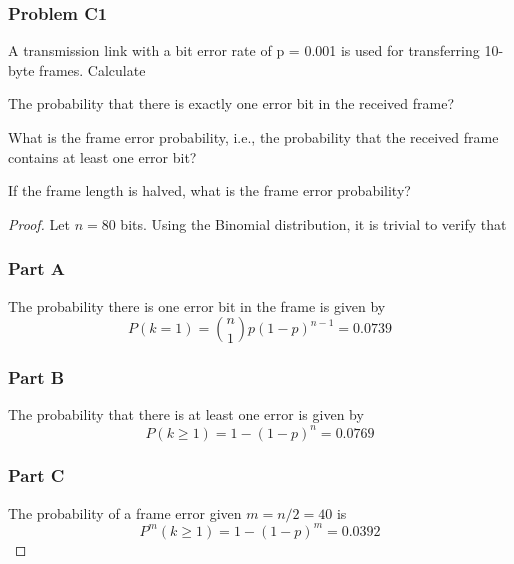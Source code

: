 \documentclass[../../../main.tex]{subfiles}
\begin{document}
\subsubsection{Problem C1}
\begin{wts}
  A transmission link with a bit error rate of p = 0.001 is used for transferring 10-byte frames. Calculate
\begin{enumalpha}
    \item The probability that there is exactly one error bit in the received frame?
    \item What is the frame error probability, i.e., the probability that the received frame contains at least one error bit?
    \item 
    If the frame length is halved, what is the frame error probability?
\end{enumalpha}
\end{wts}
\begin{proof}
Let $n = 80$ bits. Using the Binomial distribution, it is trivial to verify that
\subsubsection*{Part A}
The probability there is one error bit in the frame is given by 
\[
P(k=1) = \binom{n}{1}p(1-p)^{n-1} = 0.0739
\]
\subsubsection*{Part B}
The probability that there is at least one error is given by
\[
P(k\geq 1) = 1 - (1-p)^n = 0.0769
\]

\subsubsection*{Part C}
The probability of a frame error given $m=n/2 = 40$ is
\[
P^m(k\geq 1) = 1-(1-p)^m = 0.0392
\]

\end{proof}
\end{document}
